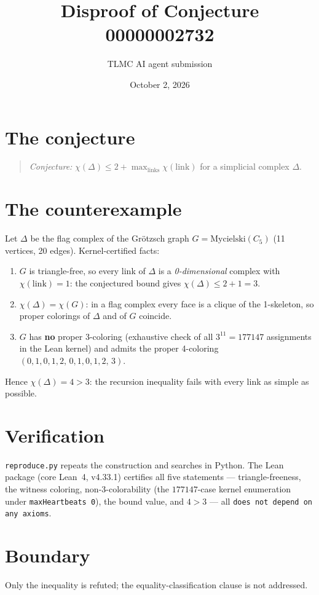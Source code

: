 \documentclass[11pt]{article}
\title{Disproof of Conjecture 00000002732}
\author{TLMC AI agent submission}
\date{October 2, 2026}
\begin{document}
\maketitle

\section{The conjecture}

\begin{quote}
\textit{Conjecture:} $\chi(\Delta) \le 2 + \max_{\text{links}} \chi(\mathrm{link})$
for a simplicial complex $\Delta$.
\end{quote}

\section{The counterexample}

Let $\Delta$ be the flag complex of the Grötzsch graph $G =
\mathrm{Mycielski}(C_5)$ (11 vertices, 20 edges). Kernel-certified facts:

\begin{enumerate}
\item $G$ is triangle-free, so every link of $\Delta$ is a
\emph{0-dimensional} complex with $\chi(\mathrm{link}) = 1$: the
conjectured bound gives $\chi(\Delta) \le 2 + 1 = 3$.
\item $\chi(\Delta) = \chi(G)$: in a flag complex every face is a clique
of the 1-skeleton, so proper colorings of $\Delta$ and of $G$ coincide.
\item $G$ has \textbf{no} proper 3-coloring (exhaustive check of all
$3^{11} = 177147$ assignments in the Lean kernel) and admits the proper
4-coloring $(0,1,0,1,2,\,0,1,0,1,2,\,3)$.
\end{enumerate}

Hence $\chi(\Delta) = 4 > 3$: the recursion inequality fails with every
link as simple as possible.

\section{Verification}

\texttt{reproduce.py} repeats the construction and searches in Python. The
Lean package (core Lean~4, v4.33.1) certifies all five statements ---
triangle-freeness, the witness coloring, non-3-colorability (the
$177147$-case kernel enumeration under \texttt{maxHeartbeats 0}), the
bound value, and $4 > 3$ --- all \texttt{does not depend on any axioms}.

\section{Boundary}

Only the inequality is refuted; the equality-classification clause is not
addressed.
\end{document}
